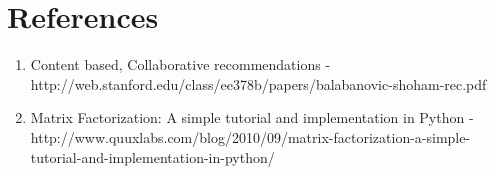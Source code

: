 \section{References}
\begin{enumerate}
\item Content based, Collaborative recommendations - http://web.stanford.edu/class/ee378b/papers/balabanovic-shoham-rec.pdf
\item Matrix Factorization: A simple tutorial and implementation in Python - http://www.quuxlabs.com/blog/2010/09/matrix-factorization-a-simple-tutorial-and-implementation-in-python/
\end{enumerate}